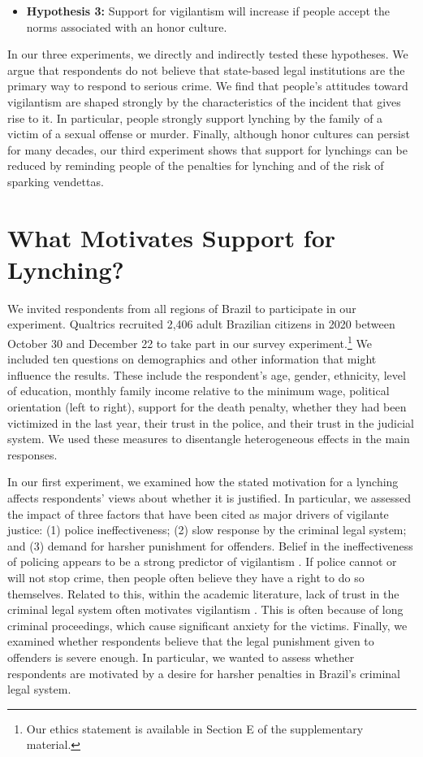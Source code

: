 \documentclass[12pt,a4paper]{article}
\begin{document}
\begin{itemize}
  \item \textbf{Hypothesis 3:} Support for vigilantism will increase if people accept the norms associated with an honor culture.  
  \end{itemize}

In our three experiments, we directly and indirectly tested these hypotheses. We argue that respondents do not believe that state-based legal institutions are the primary way to respond to serious crime. We find that people's attitudes toward vigilantism are shaped strongly by the characteristics of the incident that gives rise to it. In particular, people strongly support lynching by the family of a victim of a sexual offense or murder. Finally, although honor cultures can persist for many decades, our third experiment shows that support for lynchings can be reduced by reminding people of the penalties for lynching and of the risk of sparking vendettas. 


\section{What Motivates Support for Lynching?}
\label{sub:exp02}
We invited respondents from all regions of Brazil to participate in our experiment. Qualtrics recruited 2,406 adult Brazilian citizens in 2020 between October 30 and December 22 to take part in our survey experiment.\footnote{Our ethics statement is available in Section E of the supplementary material.} We included ten questions on demographics and other information that might influence the results. These include the respondent's age, gender, ethnicity, level of education, monthly family income relative to the minimum wage, political orientation (left to right), support for the death penalty, whether they had been victimized in the last year, their trust in the police, and their trust in the judicial system. We used these measures to disentangle heterogeneous effects in the main responses.

In our first experiment, we examined how the stated motivation for a lynching affects respondents' views about whether it is justified. In particular, we assessed the impact of three factors that have been cited as major drivers of vigilante justice: (1) police ineffectiveness; (2) slow response by the criminal legal system; and (3) demand for harsher punishment for offenders. Belief in the ineffectiveness of policing appears to be a strong predictor of vigilantism \citep{cruz2019determinants, garcia2019anger}. If police cannot or will not stop crime, then people often believe they have a right to do so themselves. Related to this, within the academic literature, lack of trust in the criminal legal system often motivates vigilantism \citep{godoy2004justice, smith2019contradictions}. This is often because of long criminal proceedings, which cause significant anxiety for the victims. Finally, we examined whether respondents believe that the legal punishment given to offenders is severe enough. In particular, we wanted to assess whether respondents are motivated by a desire for harsher penalties in Brazil's criminal legal system.  
\end{document}
